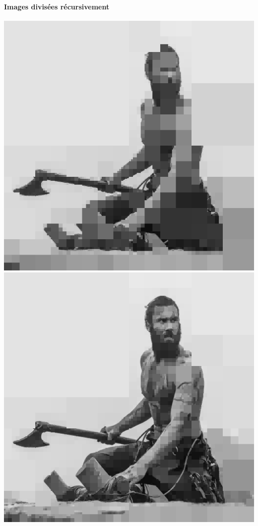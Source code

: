 \documentclass[a4paper,11pt]{article}
\begin{document}
\paragraph{Images divisées récursivement}
\vspace{2cm}
\begin{center}
\includegraphics[scale=0.33]{rolloRec40.png}
\includegraphics[scale=0.33]{rolloRec20.png}\\

\end{center}
\end{document}
